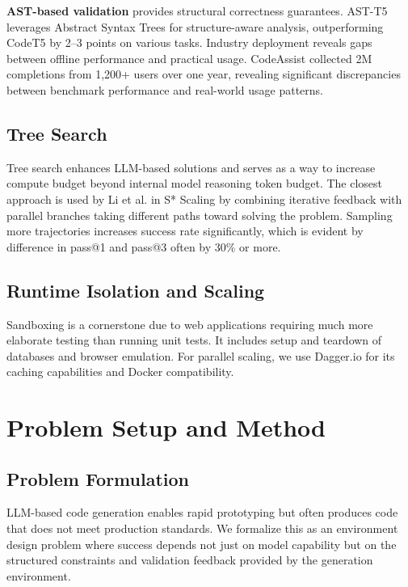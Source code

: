 \documentclass{article}
\begin{document}
\textbf{AST-based validation} provides structural correctness guarantees. AST-T5 leverages Abstract Syntax Trees for structure-aware analysis, outperforming CodeT5 by 2--3 points on various tasks. Industry deployment reveals gaps between offline performance and practical usage. CodeAssist collected 2M completions from 1,200+ users over one year, revealing significant discrepancies between benchmark performance and real-world usage patterns.

\subsection{Tree Search}

Tree search enhances LLM-based solutions and serves as a way to increase compute budget beyond internal model reasoning token budget. The closest approach is used by Li et al. in S* Scaling \citep{li2025s} by combining iterative feedback with parallel branches taking different paths toward solving the problem. Sampling more trajectories increases success rate significantly, which is evident by difference in pass@1 and pass@3 often by 30\% or more.

\subsection{Runtime Isolation and Scaling}
Sandboxing is a cornerstone due to web applications requiring much more elaborate testing than running unit tests. It includes setup and teardown of databases and browser emulation. For parallel scaling, we use Dagger.io for its caching capabilities and Docker compatibility.

\section{Problem Setup and Method}
\label{sec:method}

\subsection{Problem Formulation}

LLM-based code generation enables rapid prototyping but often produces code that does not meet production standards. We formalize this as an environment design problem where success depends not just on model capability but on the structured constraints and validation feedback provided by the generation environment.
\end{document}
